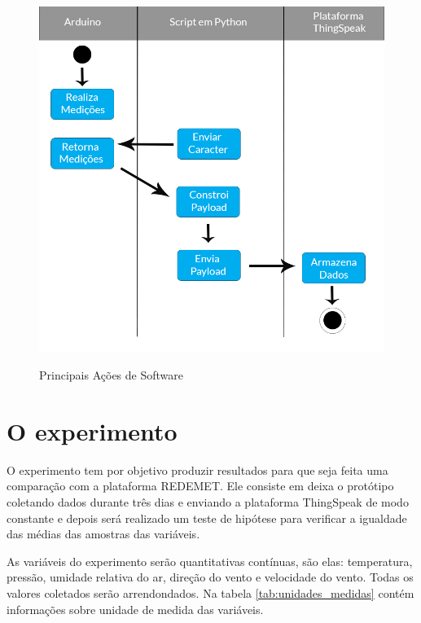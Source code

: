 \begin{figure} [!h]
    \centering
    \caption{Principais Ações de Software}
    \includegraphics [scale=0.40]{Figuras/fluxo.jpg}
    \label{fig:acoes_software}
\end{figure}

\section{O experimento}

O experimento tem por objetivo produzir resultados para que seja feita uma comparação com a plataforma REDEMET. Ele consiste em deixa o protótipo coletando dados durante três dias e enviando a plataforma ThingSpeak de modo constante e depois será realizado um teste de hipótese para verificar a igualdade das médias das amostras das variáveis.

As variáveis do experimento serão quantitativas contínuas, são elas: temperatura, pressão, umidade relativa do ar, direção do vento e velocidade do vento. Todas os valores coletados serão arrendondados. Na tabela \ref{tab:unidades_medidas} contém informações sobre unidade de medida das variáveis.

